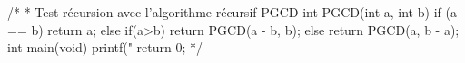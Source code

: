 /*
	* Test récursion avec l'algorithme récursif PGCD
	int PGCD(int a, int b) {
		if (a == b) {
			return a;
		}
		else {
			if(a>b)
				return PGCD(a - b, b);
			else
				return PGCD(a, b - a);
		}
	}
	int main(void) {
		printf("%
		return 0;
	}
*/
	\ELSE
		\ELSE
		\FI
	\FI
{}

